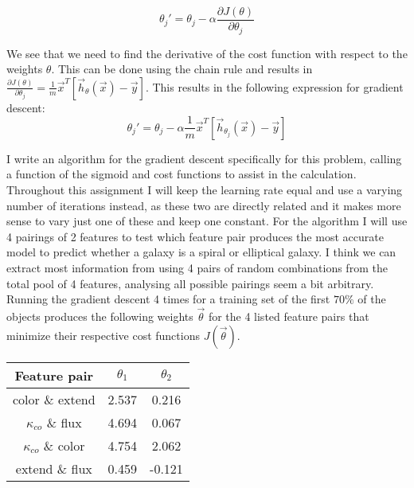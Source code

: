\begin{equation}
\theta_{j}' = \theta_j - \alpha \frac{\partial J(\theta)}{\partial \theta_j}
\end{equation}

We see that we need to find the derivative of the cost function with respect to the weights $\theta$. This can be done using the chain rule and results in $\frac{\partial J(\theta)}{\partial \theta_j} = \frac{1}{m} \vec{x}^T [\vec{h}_{\theta}(\vec{x}) - \vec{y}]$. This results in the following expression for gradient descent:\\

\begin{equation}
\theta_{j}' = \theta_j - \alpha \frac{1}{m} \vec{x}^T [\vec{h}_{\theta_j}(\vec{x}) - \vec{y}]
\end{equation}

I write an algorithm for the gradient descent specifically for this problem, calling a function of the sigmoid and cost functions to assist in the calculation. Throughout this assignment I will keep the learning rate equal and use a varying number of iterations instead, as these two are directly related and it makes more sense to vary just one of these and keep one constant. For the algorithm I will use 4 pairings of 2 features to test which feature pair produces the most accurate model to predict whether a galaxy is a spiral or elliptical galaxy. I think we can extract most information from using 4 pairs of random combinations from the total pool of 4 features, analysing all possible pairings seem a bit arbitrary. Running the gradient descent 4 times for a training set of the first $70\%$ of the objects produces the following weights $\vec{\theta}$ for the 4 listed feature pairs that minimize their respective cost functions $J(\vec{\theta})$. 

\begin{table}[!h]
\centering
\begin{tabular}{c|c|c}
\textbf{Feature pair} & $\theta_1$ & $\theta_2$\\ \hline 
color \& extend &   2.537       &     0.216\\ \hline 
$\kappa_{co}$ \& flux &     4.694      &      0.067\\ \hline 
$\kappa_{co}$ \& color &     4.754      &     2.062\\ \hline
extend \& flux &     0.459     &      -0.121
\end{tabular}
\end{table}

